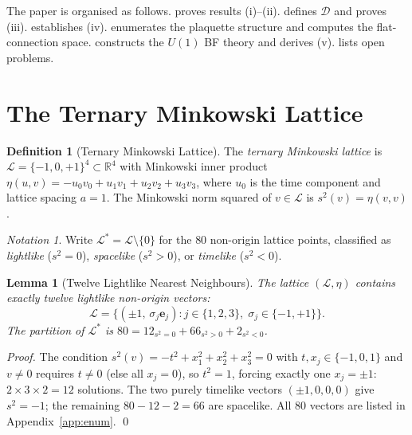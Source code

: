 \documentclass[12pt, a4paper]{article}
\theoremstyle{plain}
\newtheorem{lemma}[theorem]{Lemma}
\theoremstyle{definition}
\newtheorem{definition}[theorem]{Definition}
\theoremstyle{remark}
\newtheorem{notation}[theorem]{Notation}
\newcommand{\Lat}{\mathscr{L}}
\newcommand{\CD}{\mathscr{D}}
\newcommand{\LL}{\mathcal{L}}
\newcommand{\ssp}{s^2}
\newcommand{\R}{\mathbb{R}}
\begin{document}
The paper is organised as follows.
 proves results (i)--(ii).
 defines $\CD$ and proves (iii).
 establishes (iv).
 enumerates the plaquette structure and
computes the flat-connection space.
 constructs the $U(1)$ BF theory and derives (v).
 lists open problems.

\section{The Ternary Minkowski Lattice}\label{sec:lattice}

\begin{definition}[Ternary Minkowski Lattice]\label{def:lattice}
The \emph{ternary Minkowski lattice} is
$\Lat = \{-1,0,+1\}^4 \subset \R^4$
with Minkowski inner product
$\eta(u,v) = -u_0 v_0 + u_1 v_1 + u_2 v_2 + u_3 v_3$,
where $u_0$ is the time component and lattice spacing $a=1$.
The Minkowski norm squared of $v \in \Lat$ is $\ssp(v) = \eta(v,v)$.
\end{definition}

\begin{notation}
Write $\Lat^* = \Lat\setminus\{0\}$ for the $80$ non-origin
lattice points, classified as
\emph{lightlike} ($\ssp = 0$),
\emph{spacelike} ($\ssp > 0$), or
\emph{timelike} ($\ssp < 0$).
\end{notation}

\begin{lemma}[Twelve Lightlike Nearest Neighbours]\label{thm:12lightlike}
The lattice $(\Lat,\eta)$ contains exactly twelve lightlike
non-origin vectors:
\[
  \LL = \bigl\{(\pm1,\,\sigma_j\bm{e}_j)
    : j\in\{1,2,3\},\;\sigma_j\in\{-1,+1\}\bigr\}.
\]
The partition of $\Lat^*$ is
$80 = 12_{\ssp=0} + 66_{\ssp>0} + 2_{\ssp<0}$.
\end{lemma}

\begin{proof}
The condition $\ssp(v) = -t^2 + x_1^2+x_2^2+x_3^2 = 0$
with $t, x_j \in \{-1,0,1\}$ and $v \neq 0$
requires $t \neq 0$ (else all $x_j = 0$), so $t^2 = 1$,
forcing exactly one $x_j = \pm 1$:
$2 \times 3 \times 2 = 12$ solutions.
The two purely timelike vectors $(\pm1,0,0,0)$ give $\ssp = -1$;
the remaining $80 - 12 - 2 = 66$ are spacelike.
All 80 vectors are listed in Appendix~\ref{app:enum}.
\qed
\end{proof}
\end{document}
